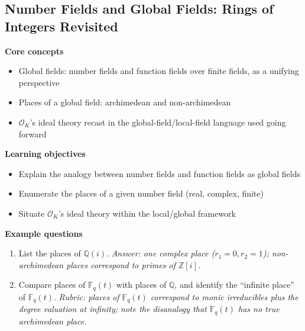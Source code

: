 \documentclass[11pt]{article}
\newcommand{\Q}{\mathbb{Q}}
\newcommand{\Z}{\mathbb{Z}}
\newcommand{\OK}{\mathcal{O}_K}
\begin{document}
\subsection{Number Fields and Global Fields: Rings of Integers Revisited}
\textbf{Core concepts}
\begin{itemize}[noitemsep]
  \item Global fields: number fields and function fields over finite fields, as a unifying perspective
  \item Places of a global field: archimedean and non-archimedean
  \item $\OK$'s ideal theory recast in the global-field/local-field language used going forward
\end{itemize}
\textbf{Learning objectives}
\begin{itemize}[noitemsep]
  \item Explain the analogy between number fields and function fields as global fields
  \item Enumerate the places of a given number field (real, complex, finite)
  \item Situate $\OK$'s ideal theory within the local/global framework
\end{itemize}
\textbf{Example questions}
\begin{enumerate}[noitemsep]
  \item[Q1 (foundational).] List the places of $\Q(i)$. \emph{Answer: one complex place ($r_1=0, r_2=1$); non-archimedean places correspond to primes of $\Z[i]$.}
  \item[Q2 (advanced).] Compare places of $\mathbb{F}_q(t)$ with places of $\Q$, and identify the ``infinite place'' of $\mathbb{F}_q(t)$. \emph{Rubric: places of $\mathbb{F}_q(t)$ correspond to monic irreducibles plus the degree valuation at infinity; note the disanalogy that $\mathbb{F}_q(t)$ has no true archimedean place.}
\end{enumerate}

\end{document}
